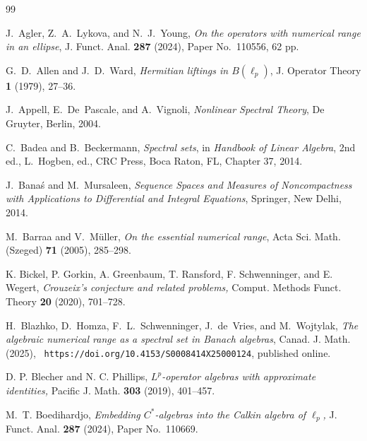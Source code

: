 \documentclass[11pt]{amsart}
\numberwithin{equation}{section}
\theoremstyle{definition}
\theoremstyle{remark}
\begin{document}
\begin{thebibliography}{99}

J.~Agler, Z.~A.~Lykova, and N.~J.~Young,
\emph{On the operators with numerical range in an ellipse},
J. Funct. Anal. \textbf{287} (2024),  Paper No.~110556, 62 pp.



G.~D.~Allen and J.~D.~Ward,
\emph{Hermitian liftings in $B(\ell_p)$},
J. Operator Theory \textbf{1} (1979), 27--36.

J.~Appell, E.~De~Pascale, and A.~Vignoli,
\emph{Nonlinear Spectral Theory},
De Gruyter, Berlin, 2004.

C.~Badea and B.~Beckermann,
\emph{Spectral sets},
in \emph{Handbook of Linear Algebra}, 2nd ed., L.~Hogben, ed.,
CRC Press, Boca Raton, FL, Chapter 37, 2014.


 
J.~Bana\'s and M.~Mursaleen,
\emph{Sequence Spaces and Measures of Noncompactness with Applications to Differential and Integral Equations},
Springer, New Delhi, 2014.

M.~Barraa and V.~M\"uller,
\emph{On the essential numerical range},
Acta Sci. Math. (Szeged) \textbf{71} (2005), 285--298.

K. Bickel, P. Gorkin, A. Greenbaum, T. Ransford, F. Schwenninger, and E. Wegert, \emph{Crouzeix's conjecture and related problems,} Comput. Methods Funct. Theory \textbf{20} (2020), 701--728. 


H.~Blazhko, D.~Homza, F.~L.~Schwenninger, J.~de~Vries, and M.~Wojtylak,
\emph{The algebraic numerical range as a spectral set in Banach algebras},
Canad. J. Math. (2025), \texttt{ https://doi.org/10.4153/S0008414X25000124}, published online.



 D. P. Blecher and N. C. Phillips, \emph{
$L^p$-operator algebras with approximate identities,} Pacific J. Math. \textbf{303} (2019), 401--457.


M.~T. Boedihardjo, \emph{
Embedding \(C^*\)-algebras into the Calkin algebra of \(\ell_p\),}
J. Funct. Anal. \textbf{287} (2024),  Paper No.~110669.


\end{thebibliography}
\end{document}
